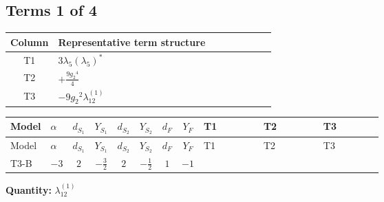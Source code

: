 \documentclass[8pt]{article}
\begin{document}
\begin{landscape}
\subsection*{Terms 1 of 4}
\begin{center}
\begin{tabular}{@{}c >{\raggedright\arraybackslash}p{0.82\linewidth}@{}}
\toprule
Column & Representative term structure \\
\midrule
T1 & \(\displaystyle 3 {\lambda_5} \left({\lambda_5}\right)^{*}\) \\
\midrule
T2 & \(\displaystyle +\frac{9 {g_2}^4}{4}\) \\
\midrule
T3 & \(\displaystyle -9 {g_2}^2 {\lambda_{12}^{(1)}}\) \\
\midrule
\bottomrule
\end{tabular}
\end{center}
\smallskip
\tiny
\begin{longtable}{@{}llcccccc >{\raggedright\arraybackslash}p{0.21\linewidth} >{\raggedright\arraybackslash}p{0.21\linewidth} >{\raggedright\arraybackslash}p{0.21\linewidth}@{}}
\toprule
Model & $\alpha$ & $d_{S_1}$ & $Y_{S_1}$ & $d_{S_2}$ & $Y_{S_2}$ & $d_F$ & $Y_F$ & T1 & T2 & T3 \\
\midrule
\endfirsthead
\toprule
Model & $\alpha$ & $d_{S_1}$ & $Y_{S_1}$ & $d_{S_2}$ & $Y_{S_2}$ & $d_F$ & $Y_F$ & T1 & T2 & T3 \\
\midrule
\endhead
T3-B & $-3$ & $2$ & $-\frac{3}{2}$ & $2$ & $-\frac{1}{2}$ & $1$ & $-1$ & \scriptsize\adjustbox{max width=\linewidth}{$\begin{gathered} 3 {\lambda_5} \left({\lambda_5}\right)^{*}\end{gathered}$} & \scriptsize\adjustbox{max width=\linewidth}{$\begin{gathered} +\frac{9 {g_2}^4}{4}\end{gathered}$} & \scriptsize\adjustbox{max width=\linewidth}{$\begin{gathered} -9 {g_2}^2 {\lambda_{12}^{(1)}}\end{gathered}$} \\
\midrule
\bottomrule
\end{longtable}
\clearpage
\noindent\textbf{Quantity: }$\lambda_{12}^{(1)}$\par\smallskip

\end{landscape}
\end{document}
